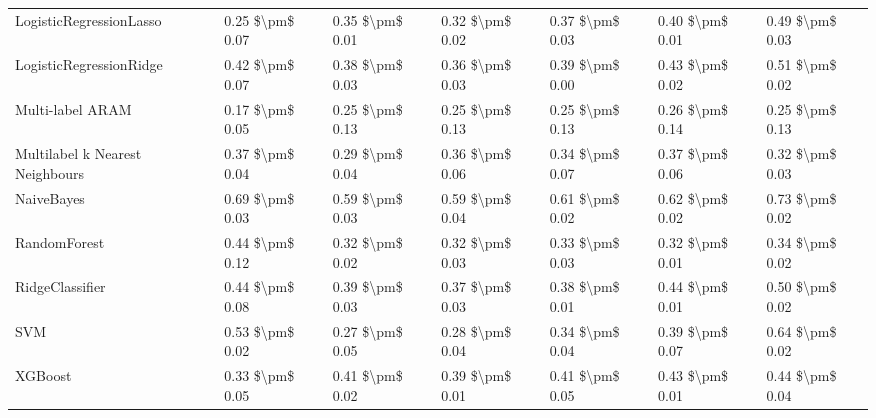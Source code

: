 \begin{tabular}{lllllll}
LogisticRegressionLasso         &  0.25 \$\textbackslash pm\$ 0.07 &           0.35 \$\textbackslash pm\$ 0.01 &       0.32 \$\textbackslash pm\$ 0.02 &        0.37 \$\textbackslash pm\$ 0.03 &                         0.40 \$\textbackslash pm\$ 0.01 &  0.49 \$\textbackslash pm\$ 0.03 \\
LogisticRegressionRidge         &  0.42 \$\textbackslash pm\$ 0.07 &           0.38 \$\textbackslash pm\$ 0.03 &       0.36 \$\textbackslash pm\$ 0.03 &        0.39 \$\textbackslash pm\$ 0.00 &                         0.43 \$\textbackslash pm\$ 0.02 &  0.51 \$\textbackslash pm\$ 0.02 \\
Multi-label ARAM                &  0.17 \$\textbackslash pm\$ 0.05 &           0.25 \$\textbackslash pm\$ 0.13 &       0.25 \$\textbackslash pm\$ 0.13 &        0.25 \$\textbackslash pm\$ 0.13 &                         0.26 \$\textbackslash pm\$ 0.14 &  0.25 \$\textbackslash pm\$ 0.13 \\
Multilabel k Nearest Neighbours &  0.37 \$\textbackslash pm\$ 0.04 &           0.29 \$\textbackslash pm\$ 0.04 &       0.36 \$\textbackslash pm\$ 0.06 &        0.34 \$\textbackslash pm\$ 0.07 &                         0.37 \$\textbackslash pm\$ 0.06 &  0.32 \$\textbackslash pm\$ 0.03 \\
NaiveBayes                      &  0.69 \$\textbackslash pm\$ 0.03 &           0.59 \$\textbackslash pm\$ 0.03 &       0.59 \$\textbackslash pm\$ 0.04 &        0.61 \$\textbackslash pm\$ 0.02 &                         0.62 \$\textbackslash pm\$ 0.02 &  0.73 \$\textbackslash pm\$ 0.02 \\
RandomForest                    &  0.44 \$\textbackslash pm\$ 0.12 &           0.32 \$\textbackslash pm\$ 0.02 &       0.32 \$\textbackslash pm\$ 0.03 &        0.33 \$\textbackslash pm\$ 0.03 &                         0.32 \$\textbackslash pm\$ 0.01 &  0.34 \$\textbackslash pm\$ 0.02 \\
RidgeClassifier                 &  0.44 \$\textbackslash pm\$ 0.08 &           0.39 \$\textbackslash pm\$ 0.03 &       0.37 \$\textbackslash pm\$ 0.03 &        0.38 \$\textbackslash pm\$ 0.01 &                         0.44 \$\textbackslash pm\$ 0.01 &  0.50 \$\textbackslash pm\$ 0.02 \\
SVM                             &  0.53 \$\textbackslash pm\$ 0.02 &           0.27 \$\textbackslash pm\$ 0.05 &       0.28 \$\textbackslash pm\$ 0.04 &        0.34 \$\textbackslash pm\$ 0.04 &                         0.39 \$\textbackslash pm\$ 0.07 &  0.64 \$\textbackslash pm\$ 0.02 \\
XGBoost                         &  0.33 \$\textbackslash pm\$ 0.05 &           0.41 \$\textbackslash pm\$ 0.02 &       0.39 \$\textbackslash pm\$ 0.01 &        0.41 \$\textbackslash pm\$ 0.05 &                         0.43 \$\textbackslash pm\$ 0.01 &  0.44 \$\textbackslash pm\$ 0.04 \\
\bottomrule
\end{tabular}
